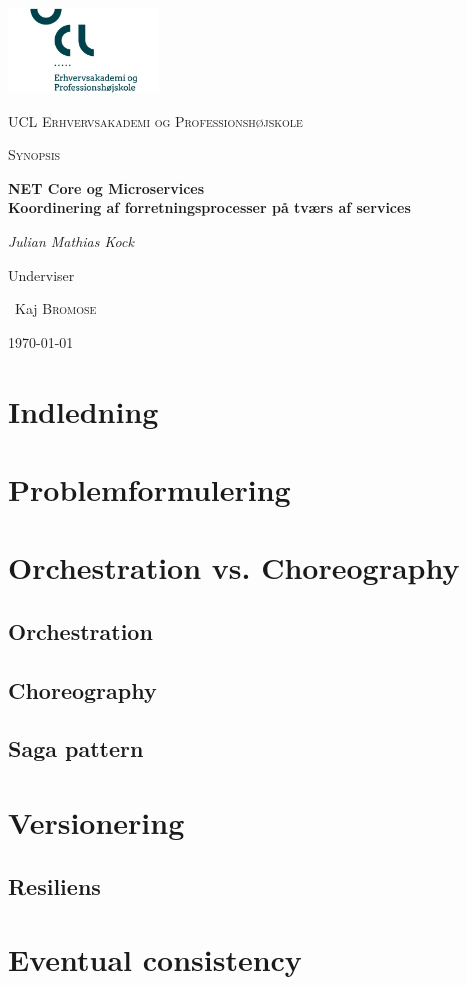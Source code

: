 \documentclass[12pt]{article} %
\begin{document}
\begin{titlepage}
	\centering
	\includegraphics[width=0.3\textwidth]{ucllogo}\par\vspace{1cm}
	{\scshape\LARGE UCL Erhvervsakademi og Professionshøjskole \par}
	\vspace{1cm}
	{\scshape\Large Synopsis\par}
	\vspace{1.5cm}
	{\huge\bfseries NET Core og Microservices \\ \large Koordinering af forretningsprocesser på tværs af services\par}
	\vspace{2cm}
	{\Large\itshape Julian Mathias Kock\par}
	\vfill
	Underviser \par
	~Kaj \textsc{Bromose}
	\vfill
	{\large \today\par}

\end{titlepage}

\tableofcontents
\newpage
\section{ Indledning }
\section{ Problemformulering }
\section{ Orchestration vs. Choreography }
\subsection{ Orchestration }
\subsection{ Choreography }
\subsection { Saga pattern }
\section { Versionering }
\subsection { Resiliens }
\section { Eventual consistency }
\end{document}
